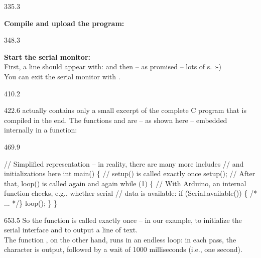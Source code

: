 \documentclass{aslab}
\makeatletter
\newcommand*\aN[1]{\textcolor{codeorange}{#1}}%
\newcommand*\aI[1]{\textcolor{codegreen}{#1}}%
\newcommand*\aK[1]{\textcolor{codered}{#1}}%
\newcommand*\aC[1]{\textcolor{codepurple}{#1}}%
\newenvironment{asmlisting}[1][11]{\par
  \edef\asm@bs{\the\baselineskip}\fontsize{#1bp}{\asm@bs}\selectfont
  \ttfamily\asm@setup}{\par}
\makeatother
\begin{document}
\begin{region}{335.3}
\begin{numlist}[start=2]
\item \textbf{Compile and upload the program:} 
\end{numlist}
\end{region}

\begin{region}[pitch=12.33]{348.3}
\begin{numlist}[start=3]
\item \textbf{Start the serial monitor:} \\
  First, a line should appear with: 
  and then -- as promised -- lots of s. :-)\\
  You can exit the serial monitor with .
\end{numlist}
\end{region}

\begin{region}{410.2}
\end{region}

\begin{region}[pitch=12.3]{422.6}
 actually contains only a small excerpt of the complete
C program that is compiled in the end. The functions  and
 are -- as shown here -- embedded internally in a
 function:
\end{region}

\begin{region}[pitch=10]{469.9}
\begin{asmlisting}[9]
\aC{// Simplified representation – in reality, there are many more includes}
\aC{// and initializations here}
\mbox{}
\aI{int} main()
\{
    \aC{// setup() is called exactly once}
    setup();
\mbox{}
    \aC{// After that, loop() is called again and again}
    \aN{while} (\aK{1}) \{
        \aC{// With Arduino, an internal function checks, e.g., whether serial}
        \aC{// data is available:}
        \aN{if} (Serial.available()) \{ \aC{/* ... */}\}
\mbox{}
        loop();
    \}
\}
\end{asmlisting}
\end{region}

\begin{region}[pitch=12.2]{653.5}
So the function  is called exactly once -- in our example, to
initialize the serial interface and to output a line of text.\\
The function , on the other hand, runs in an endless loop: in
each pass, the character  is output, followed by a wait of 1000
milliseconds (i.e., one second).
\end{region}
\end{document}
